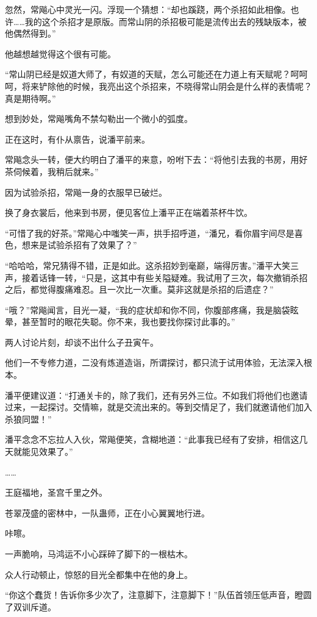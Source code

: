 \begin{this_body}
忽然，常飚心中灵光一闪。浮现一个猜想：“却也蹊跷，两个杀招如此相像。也许……我的这个杀招才是原版。而常山阴的杀招极可能是流传出去的残缺版本，被他偶然得到。”

他越想越觉得这个很有可能。

“常山阴已经是奴道大师了，有奴道的天赋，怎么可能还在力道上有天赋呢？呵呵呵，将来铲除他的时候，我亮出这个杀招来，不晓得常山阴会是什么样的表情呢？真是期待啊。”

想到妙处，常飚嘴角不禁勾勒出一个微小的弧度。

正在这时，有仆从禀告，说潘平前来。

常飚念头一转，便大约明白了潘平的来意，吩咐下去：“将他引去我的书房，用好茶伺候着，我稍后就来。”

因为试验杀招，常飚一身的衣服早已破烂。

换了身衣裳后，他来到书房，便见客位上潘平正在端着茶杯牛饮。

“可惜了我的好茶。”常飚心中嗤笑一声，拱手招呼道，“潘兄，看你眉宇间尽是喜色，想来是试验杀招有了效果了？”

“哈哈哈，常兄猜得不错，正是如此。这杀招妙到毫巅，端得厉害。”潘平大笑三声，接着话锋一转，“只是，这其中有些关隘疑难。我试用了三次，每次撤销杀招之后，都觉得腹痛难忍。且一次比一次重。莫非这就是杀招的后遗症？”

“哦？”常飚闻言，目光一凝，“我的症状却和你不同，你腹部疼痛，我是脑袋眩晕，甚至暂时的眼花失聪。你不来，我也要找你探讨此事的。”

两人讨论片刻，却谈不出什么子丑寅午。

他们一不专修力道，二没有炼道造诣，所谓探讨，都只流于试用体验，无法深入根本。

潘平便建议道：“打通关卡的，除了我们，还有另外三位。不如我们将他们也邀请过来，一起探讨。交情嘛，就是交流出来的。等到交情足了，我们就邀请他们加入杀狼同盟！”

潘平念念不忘拉人入伙，常飚便笑，含糊地道：“此事我已经有了安排，相信这几天就能见效果了。”

……

王庭福地，圣宫千里之外。

苍翠茂盛的密林中，一队蛊师，正在小心翼翼地行进。

咔嚓。

一声脆响，马鸿运不小心踩碎了脚下的一根枯木。

众人行动顿止，惊怒的目光全都集中在他的身上。

“你这个蠢货！告诉你多少次了，注意脚下，注意脚下！”队伍首领压低声音，瞪圆了双训斥道。


\end{this_body}
